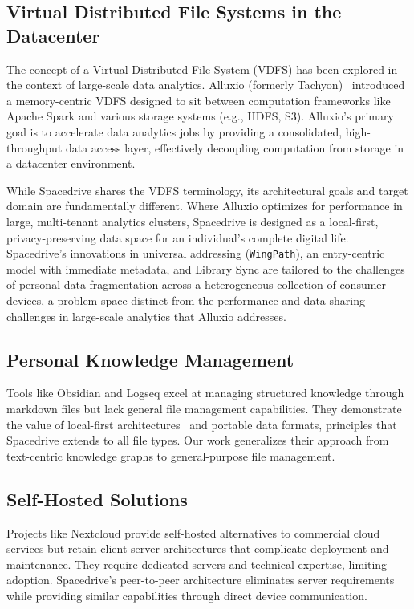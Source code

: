 \documentclass[sigconf]{acmart}
\begin{document}
\subsection{Virtual Distributed File Systems in the Datacenter}
The concept of a Virtual Distributed File System (VDFS) has been explored in the context of large-scale data analytics. Alluxio (formerly Tachyon)~\cite{alluxio_vdfs} introduced a memory-centric VDFS designed to sit between computation frameworks like Apache Spark and various storage systems (e.g., HDFS, S3). Alluxio's primary goal is to accelerate data analytics jobs by providing a consolidated, high-throughput data access layer, effectively decoupling computation from storage in a datacenter environment.

While Spacedrive shares the VDFS terminology, its architectural goals and target domain are fundamentally different. Where Alluxio optimizes for performance in large, multi-tenant analytics clusters, Spacedrive is designed as a local-first, privacy-preserving data space for an individual's complete digital life. Spacedrive's innovations in universal addressing (\texttt{WingPath}), an entry-centric model with immediate metadata, and Library Sync are tailored to the challenges of personal data fragmentation across a heterogeneous collection of consumer devices, a problem space distinct from the performance and data-sharing challenges in large-scale analytics that Alluxio addresses.

\subsection{Personal Knowledge Management}
Tools like Obsidian and Logseq excel at managing structured knowledge through markdown files but lack general file management capabilities. They demonstrate the value of local-first architectures~\cite{kleppmann_localfirst_2019} and portable data formats, principles that Spacedrive extends to all file types. Our work generalizes their approach from text-centric knowledge graphs to general-purpose file management.

\subsection{Self-Hosted Solutions}
Projects like Nextcloud provide self-hosted alternatives to commercial cloud services but retain client-server architectures that complicate deployment and maintenance. They require dedicated servers and technical expertise, limiting adoption. Spacedrive's peer-to-peer architecture eliminates server requirements while providing similar capabilities through direct device communication.
\end{document}

